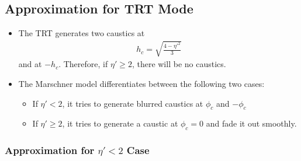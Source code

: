 \documentclass[10pt]{article}
\begin{document}
  \subsection{Approximation for TRT Mode}
  
  \begin{itemize}
    \item The TRT generates two caustics at 
      \begin{align*}
        h_c = \sqrt{ \frac{4 - \eta'^2}{3} }
      \end{align*}
      and at $-h_c$. 
      Therefore, if $\eta' \geq 2$, there will be no caustics.
      
    \item The Marschner model differentiates between the following
      two cases:
      \begin{itemize}
        \item If $\eta' < 2$, it tries to generate blurred 
          caustics at $\phi_c$ and $-\phi_c$
          
        \item If $\eta' \geq 2$, it tries to generate a caustic
          at $\phi_c = 0$ and fade it out smoothly.
      \end{itemize}
  \end{itemize}
  
  \subsubsection{Approximation for $\eta' < 2$ Case}
  
\end{document}
